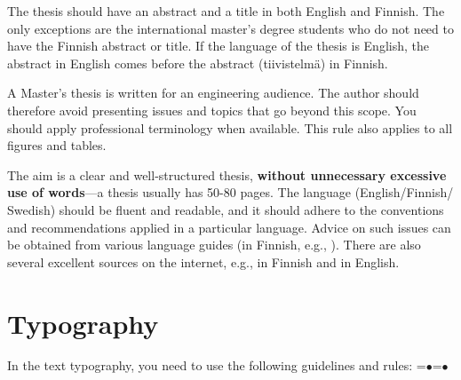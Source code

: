 The thesis should have an abstract and a title in both English and Finnish. The only exceptions are the international master’s degree students who do not need to have the Finnish abstract or title. If the language of the thesis is English, the abstract in English comes before the abstract (tiivistelmä) in Finnish.

A Master’s thesis is written for an engineering audience. The author should therefore avoid presenting issues and topics that go beyond this scope. You should apply professional terminology when available. This rule also applies to all figures and tables.

The aim is a clear and well-structured thesis, \textbf{without unnecessary excessive use of words}---a thesis usually has 50-80 pages. The language (English/Finnish/ Swedish) should be fluent and readable, and it should adhere to the conventions and recommendations applied in a particular language. Advice on such issues can be obtained from various language guides (in Finnish, e.g., \cite{maamies}). There are also several excellent sources on the internet, e.g., \cite{korpela, kielitoimisto} in Finnish and \cite{reportwriting, englishlanguage} in English.

\section{Typography}

In the text typography, you need to use the following guidelines and rules:
\newlength{\mylen}
=\hbox{$\bullet$}=\hbox{\tiny$\bullet$}
\setlength{\mylen}{\dimexpr0.7\ht1-0.5\ht2}
\renewcommand\labelitemi{\raisebox{\mylen}{\tiny$\bullet$}}
\renewcommand\labelitemii{\raisebox{\mylen}{\tiny$\bullet$}}

